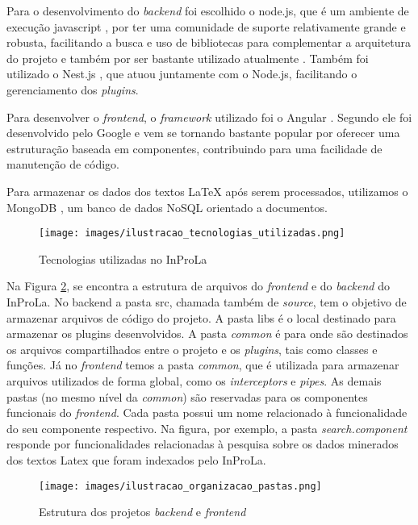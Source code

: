 \documentclass[12pt]{article}
\begin{document}
Para o desenvolvimento do \textit{backend} foi escolhido o node.js, que é um ambiente de execução javascript \cite{nodejs_about}, por ter uma comunidade de suporte relativamente grande e robusta, facilitando a busca e uso de bibliotecas para complementar a arquitetura do projeto e também por ser bastante utilizado atualmente \cite{kinsta2023}. Também foi utilizado o Nest.js \cite{nestjs_docs}, que atuou juntamente com o Node.js, facilitando o gerenciamento dos \textit{plugins}. 
 
Para desenvolver o \textit{frontend}, o \textit{framework} utilizado foi o Angular \cite{angular_overview}. Segundo \cite{angular_transformando_2024} ele foi desenvolvido pelo Google e vem se tornando bastante popular por oferecer uma estruturação baseada em componentes, contribuindo para uma facilidade de manutenção de código.

Para armazenar os dados dos textos LaTeX após serem processados, utilizamos o MongoDB \cite{mongodb_docs}, um banco de dados NoSQL orientado a documentos.

 \begin{figure}[htb]
\centering
\texttt{[image: images/ilustracao\_tecnologias\_utilizadas.png]}
\caption{Tecnologias utilizadas no InProLa}
\label{fig:tecnologias_inprola}
\end{figure}
 
 Na Figura \ref{fig:pastas_inprola}, se encontra a estrutura de
 arquivos do \textit{frontend} e do \textit{backend} do InProLa. No backend a pasta src, chamada também de \textit{source}, tem o objetivo de armazenar arquivos de código do projeto. A pasta libs é o local destinado para armazenar os plugins desenvolvidos. A pasta \textit{common} é para onde são destinados os arquivos compartilhados entre o projeto e os \textit{plugins}, tais como classes e funções. Já no \textit{frontend} temos a pasta \textit{common}, que é utilizada para armazenar arquivos utilizados de forma global, como os \textit{interceptors} e \textit{pipes}. As demais pastas (no mesmo nível da \textit{common}) são reservadas para os componentes funcionais do \textit{frontend}. Cada pasta possui um nome relacionado à funcionalidade do seu componente respectivo. Na figura, por exemplo, a pasta \textit{search.component} responde por funcionalidades relacionadas à pesquisa sobre os dados minerados dos textos Latex que foram indexados pelo InProLa.

\begin{figure}[htb]
\centering
\texttt{[image: images/ilustracao\_organizacao\_pastas.png]}
\caption{Estrutura dos projetos \textit{backend} e \textit{frontend}}
\label{fig:pastas_inprola}
\end{figure}
\end{document}
